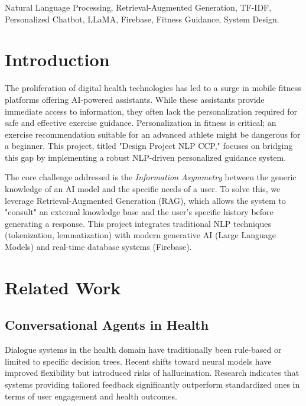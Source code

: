 \documentclass[conference]{IEEEtran}
\begin{document}
\begin{IEEEkeywords}
Natural Language Processing, Retrieval-Augmented Generation, TF-IDF, Personalized Chatbot, LLaMA, Firebase, Fitness Guidance, System Design.
\end{IEEEkeywords}

\section{Introduction}

The proliferation of digital health technologies has led to a surge in mobile fitness platforms offering AI-powered assistants. While these assistants provide immediate access to information, they often lack the personalization required for safe and effective exercise guidance. Personalization in fitness is critical; an exercise recommendation suitable for an advanced athlete might be dangerous for a beginner. This project, titled "Design Project NLP CCP," focuses on bridging this gap by implementing a robust NLP-driven personalized guidance system.

The core challenge addressed is the \textit{Information Asymmetry} between the generic knowledge of an AI model and the specific needs of a user. To solve this, we leverage Retrieval-Augmented Generation (RAG), which allows the system to "consult" an external knowledge base and the user's specific history before generating a response. This project integrates traditional NLP techniques (tokenization, lemmatization) with modern generative AI (Large Language Models) and real-time database systems (Firebase).

\section{Related Work}

\subsection{Conversational Agents in Health}
Dialogue systems in the health domain have traditionally been rule-based or limited to specific decision trees. Recent shifts toward neural models have improved flexibility but introduced risks of hallucination. Research indicates that systems providing tailored feedback significantly outperform standardized ones in terms of user engagement and health outcomes.
\end{document}
